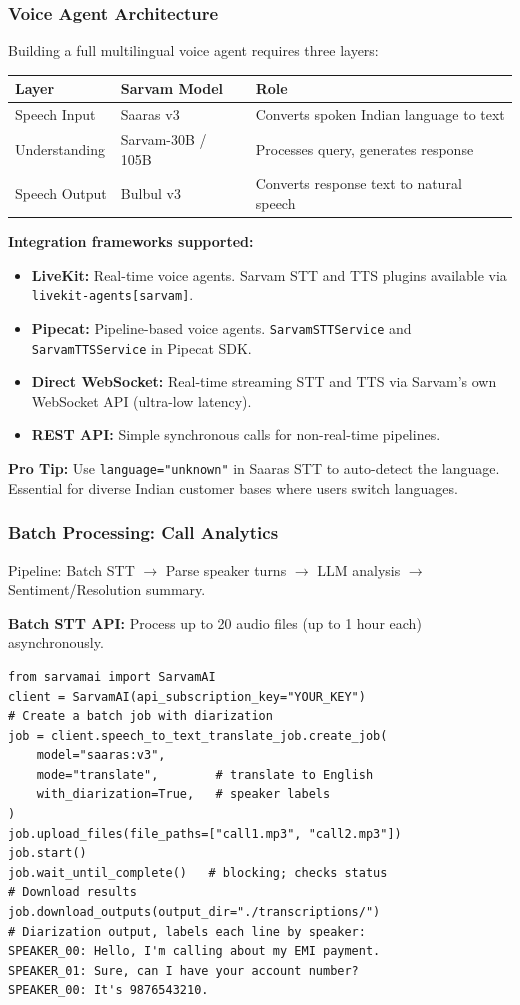\begin{frame}[fragile]\frametitle{Voice Agent Architecture}
Building a full multilingual voice agent requires three layers:
\begin{center}
\begin{tabular}{|l|l|l|}
\hline
\textbf{Layer} & \textbf{Sarvam Model} & \textbf{Role} \\
\hline
Speech Input & Saaras v3 & Converts spoken Indian language to text \\
Understanding & Sarvam-30B / 105B & Processes query, generates response \\
Speech Output & Bulbul v3 & Converts response text to natural speech \\
\hline
\end{tabular}
\end{center}

\textbf{Integration frameworks supported:}
  \begin{itemize}
    \item \textbf{LiveKit:} Real-time voice agents. Sarvam STT and TTS plugins available via \texttt{livekit-agents[sarvam]}.
    \item \textbf{Pipecat:} Pipeline-based voice agents. \texttt{SarvamSTTService} and \texttt{SarvamTTSService} in Pipecat SDK.
    \item \textbf{Direct WebSocket:} Real-time streaming STT and TTS via Sarvam's own WebSocket API (ultra-low latency).
    \item \textbf{REST API:} Simple synchronous calls for non-real-time pipelines.
  \end{itemize}

\textbf{Pro Tip:} Use \texttt{language="unknown"} in Saaras STT to auto-detect the language. Essential for diverse Indian customer bases where users switch languages.
\end{frame}

\begin{frame}[fragile]\frametitle{Batch Processing: Call Analytics}

Pipeline: Batch STT $\to$ Parse speaker turns $\to$ LLM analysis $\to$ Sentiment/Resolution summary.


\textbf{Batch STT API:} Process up to 20 audio files (up to 1 hour each) asynchronously.
\begin{lstlisting}
from sarvamai import SarvamAI
client = SarvamAI(api_subscription_key="YOUR_KEY")
# Create a batch job with diarization
job = client.speech_to_text_translate_job.create_job(
    model="saaras:v3",
    mode="translate",        # translate to English
    with_diarization=True,   # speaker labels
)
job.upload_files(file_paths=["call1.mp3", "call2.mp3"])
job.start()
job.wait_until_complete()   # blocking; checks status
# Download results
job.download_outputs(output_dir="./transcriptions/")
# Diarization output, labels each line by speaker:
SPEAKER_00: Hello, I'm calling about my EMI payment.
SPEAKER_01: Sure, can I have your account number?
SPEAKER_00: It's 9876543210.
\end{lstlisting}
\end{frame}

